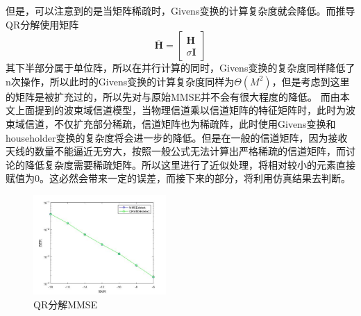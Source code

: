 \documentclass[bachelor,nocolorlinks, printoneside]{seuthesis} %
\begin{document}
\begin{Main}
但是，可以注意到的是当矩阵稀疏时，Givens变换的计算复杂度就会降低。而推导QR分解使用矩阵
\begin{equation}\label{key}
\overline{\mathbf{H}} = \left[
\begin{array}{c}
\mathbf{H}\\
\sigma \mathbf{I}
\end{array} \right]
\end{equation}
其下半部分属于单位阵，所以在并行计算的同时，Givens变换的复杂度同样降低了n次操作，所以此时的Givens变换的计算复杂度同样为$\Theta(M^2)$，但是考虑到这里的矩阵是被扩充过的，所以先对与原始MMSE并不会有很大程度的降低。
而由本文上面提到的波束域信道模型，当物理信道乘以信道矩阵的特征矩阵时，此时为波束域信道，不仅扩充部分稀疏，信道矩阵也为稀疏阵，此时使用Givens变换和householder变换的复杂度将会进一步的降低。但是在一般的信道矩阵，因为接收天线的数量不能逼近无穷大，按照一般公式无法计算出严格稀疏的信道矩阵，而讨论的降低复杂度需要稀疏矩阵。所以这里进行了近似处理，将相对较小的元素直接赋值为0。这必然会带来一定的误差，而接下来的部分，将利用仿真结果去判断。
\begin{figure}[htbp!]
	\centering \includegraphics[width=0.45\textwidth]{img/3_9.jpg} \caption{QR分解MMSE}
\end{figure}

\end{Main}
\end{document}
